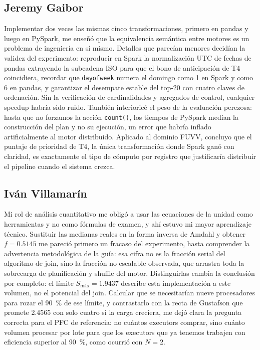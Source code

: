 \documentclass[10pt,journal]{IEEEtran}
\begin{document}
\subsection{Jeremy Gaibor}
Implementar dos veces las mismas cinco transformaciones, primero en pandas y
luego en PySpark, me ense\~n\'o que la equivalencia sem\'antica entre motores
es un problema de ingenier\'ia en s\'i mismo. Detalles que parec\'ian menores
decid\'ian la validez del experimento: reproducir en Spark la normalizaci\'on
UTC de fechas de pandas extrayendo la subcadena ISO para que el bono de
anticipaci\'on de T4 coincidiera, recordar que \texttt{dayofweek} numera el
domingo como 1 en Spark y como 6 en pandas, y garantizar el desempate estable
del top-20 con cuatro claves de ordenaci\'on. Sin la verificaci\'on de
cardinalidades y agregados de control, cualquier speedup habr\'ia sido ruido.
Tambi\'en interioric\'e el peso de la evaluaci\'on perezosa: hasta que no
forzamos la acci\'on \texttt{count()}, los tiempos de PySpark med\'ian la
construcci\'on del plan y no su ejecuci\'on, un error que habr\'ia inflado
artificialmente al motor distribuido. Aplicado al dominio FUVV, concluyo que
el puntaje de prioridad de T4, la \'unica transformaci\'on donde Spark gan\'o
con claridad, es exactamente el tipo de c\'omputo por registro que
justificar\'ia distribuir el pipeline cuando el sistema crezca.

\subsection{Iv\'an Villamar\'in}
Mi rol de an\'alisis cuantitativo me oblig\'o a usar las ecuaciones de la
unidad como herramientas y no como f\'ormulas de examen, y ah\'i estuvo mi
mayor aprendizaje t\'ecnico. Sustituir las medianas reales en la forma inversa
de Amdahl y obtener $f = \num{0.5145}$ me pareci\'o primero un fracaso del
experimento, hasta comprender la advertencia metodol\'ogica de la gu\'ia: esa
cifra no es la fracci\'on serial del algoritmo de join, sino la fracci\'on no
escalable observada, que arrastra toda la sobrecarga de planificaci\'on y
shuffle del motor. Distinguirlas cambia la conclusi\'on por completo: el
l\'imite $S_{\text{m\'ax}} = \num{1.9437}$ describe esta implementaci\'on a
este volumen, no el potencial del join. Calcular que se necesitar\'ian nueve
procesadores para rozar el \SI{90}{\percent} de ese l\'imite, y contrastarlo
con la recta de Gustafson que promete \num{2.4565} con solo cuatro si la carga
creciera, me dej\'o clara la pregunta correcta para el PFC de referencia: no
cu\'antos executors comprar, sino cu\'anto volumen procesar por lote para que
los executors que ya tenemos trabajen con eficiencia superior al
\SI{90}{\percent}, como ocurri\'o con $N=2$.
\end{document}
